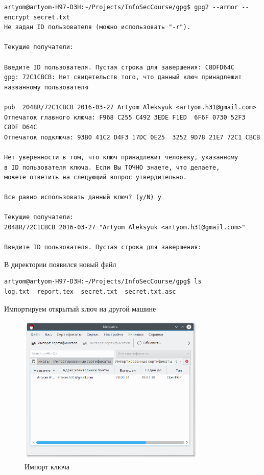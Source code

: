 \begin{lstlisting}
artyom@artyom-H97-D3H:~/Projects/InfoSecCourse/gpg$ gpg2 --armor --encrypt secret.txt 
Не задан ID пользователя (можно использовать "-r").

Текущие получатели:

Введите ID пользователя. Пустая строка для завершения: C8DFD64C
gpg: 72C1CBCB: Нет свидетельств того, что данный ключ принадлежит названному пользователю

pub  2048R/72C1CBCB 2016-03-27 Artyom Aleksyuk <artyom.h31@gmail.com>
Отпечаток главного ключа: F968 C255 C492 3EDE F1ED  6F6F 0730 52F3 C8DF D64C
Отпечаток подключа: 93B0 41C2 D4F3 17DC 0E25  3252 9D78 21E7 72C1 CBCB

Нет уверенности в том, что ключ принадлежит человеку, указанному
в ID пользователя ключа. Если Вы ТОЧНО знаете, что делаете,
можете ответить на следующий вопрос утвердительно.

Все равно использовать данный ключ? (y/N) y

Текущие получатели:
2048R/72C1CBCB 2016-03-27 "Artyom Aleksyuk <artyom.h31@gmail.com>"

Введите ID пользователя. Пустая строка для завершения: 
\end{lstlisting}

В директории появился новый файл

\begin{lstlisting}
artyom@artyom-H97-D3H:~/Projects/InfoSecCourse/gpg$ ls
log.txt  report.tex  secret.txt  secret.txt.asc
\end{lstlisting}

Импортируем открытый ключ на другой машине

\begin{figure}[H]
	\centering
	\includegraphics[width=0.8\textwidth]{figures/screen22.png}
	\caption{Импорт ключа}
\end{figure}

